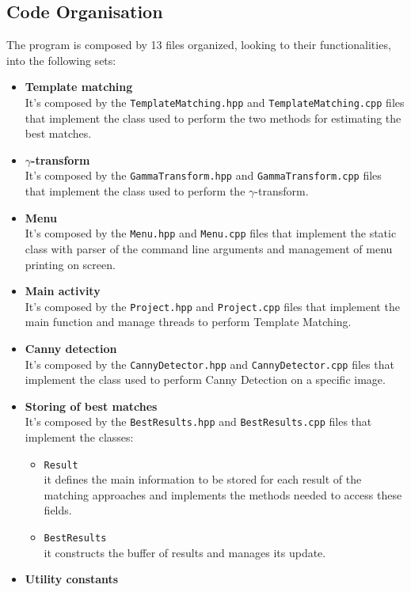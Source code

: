\documentclass{article}
\begin{document}
\subsection{Code Organisation}
The program is composed by 13 files organized, looking to their functionalities, into the following sets:
\begin{itemize}
\item{\textbf{Template matching}\\
It's composed by the \texttt{TemplateMatching.hpp} and \texttt{TemplateMatching.cpp} files that implement the class used to perform the two methods for estimating the best matches.
}
\item{\textbf{$\gamma$-transform}\\
It's composed by the \texttt{GammaTransform.hpp} and \texttt{GammaTransform.cpp} files that implement the class used to perform the $\gamma$-transform. 
}
\item{\textbf{Menu}\\
It's composed by the \texttt{Menu.hpp} and \texttt{Menu.cpp} files that implement the static class with parser of the command line arguments and management of menu printing on screen.
}
\item{\textbf{Main activity}\\
It's composed by the \texttt{Project.hpp} and \texttt{Project.cpp} files that implement the main function and manage threads to perform Template Matching.
}
\item{\textbf{Canny detection}\\
It's composed by the \texttt{CannyDetector.hpp} and \texttt{CannyDetector.cpp} files that implement the class used to perform Canny Detection on a specific image.
}
\item{\textbf{Storing of best matches}\\
It's composed by the \texttt{BestResults.hpp} and \texttt{BestResults.cpp} files that implement the classes:
\begin{itemize}
\item{\texttt{Result}\\
it defines the main information to be stored for each result of the matching approaches and implements the methods needed to access these fields.
}
\item{\texttt{BestResults}\\
it constructs the buffer of results and manages its update.
}
\end{itemize}
}
\item{\textbf{Utility constants}\\
}
\end{itemize}
\end{document}
